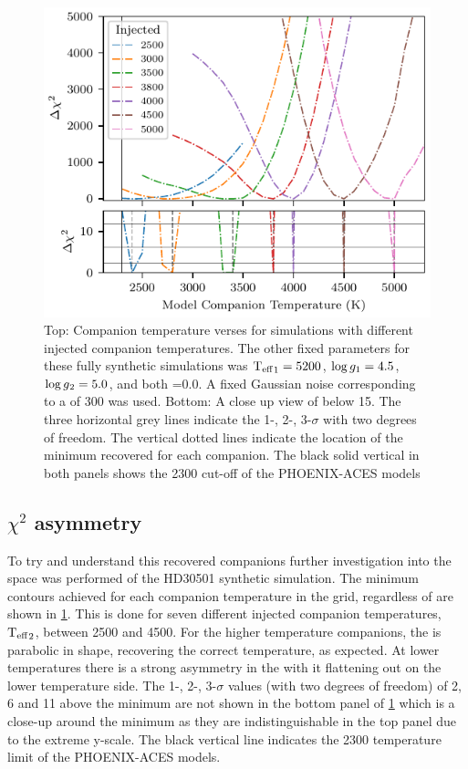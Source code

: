 \begin{figure}
    \centering
    \includegraphics[width=0.7\linewidth]{figures/companion_recovery/chi2_shape_investigation_with_delta}
    \caption[Shape of simulated \textchisquared{} with different injected companion temperatures.]{Top: Companion temperature verses \textchisquared{} for simulations with different injected companion temperatures.
        The other fixed parameters for these fully synthetic simulations was \({\textrm{T}_{\mathrm{eff}}}_{1}=5200\)\K{}, \(\log{g}_{1}=4.5\), \(\log{g}{}_{2}=5.0\), and both \feh{}=0.0.
        A fixed Gaussian noise corresponding to a \snr{} of 300 was used.
        Bottom: A close up view of \textchisquared{} below 15.
        The three horizontal grey lines indicate the 1-, 2-, 3-$\sigma$ with two degrees of freedom.
        The vertical dotted lines indicate the location of the minimum \textchisquared{} recovered for each companion.
        The black solid vertical in both panels shows the 2300\K{} cut-off of the {PHOENIX-ACES} models}
    \label{fig:injection_shape}
\end{figure}

\todo{}
\subsection{\(\chi^2\) asymmetry} 
\label{subsec:chi2_assymetry}

To try and understand this recovered companions further investigation into the \textchisquared{} space was performed of the {HD30501} synthetic simulation.
The minimum \textchisquared{} contours achieved for each companion temperature in the grid, regardless of \Rvtwo{} are shown in \cref{fig:injection_shape}.
This is done for seven different injected companion temperatures, \({\textrm{T}_{\mathrm{eff}}}_{2}\), between 2500 and 4500\K{}.
For the higher temperature companions, the \textchisquared{} is parabolic in shape, recovering the correct temperature, as expected.
At lower temperatures there is a strong asymmetry in the \textchisquared{} with it flattening out on the lower temperature side.
The 1-, 2-, 3-\(\sigma\) values (with two degrees of freedom) of 2, 6 and 11 above the minimum \textchisquared{} are not shown in the bottom panel of \cref{fig:injection_shape} which is a close-up around the minimum \textchisquared{} as they are indistinguishable in the top panel due to the extreme \textchisquared{} y-scale.
The black vertical line indicates the 2300\K{} temperature limit of the {PHOENIX-ACES} models.

